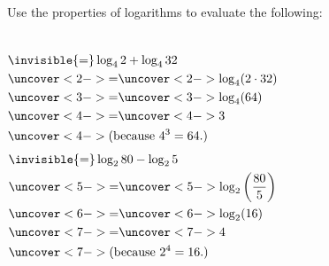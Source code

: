 \begin{frame}
\begin{example}%
Use the properties of logarithms to evaluate the following:
\begin{columns}[t]
\begin{align*}
& \invisible{=} \log_4 2 + \log_4 32 \\
&\uncover<2->{=}  \uncover<2->{\log_4 (2\cdot 32 )} \\
&\uncover<3->{=}  \uncover<3->{\log_4 (64)} \\
&\uncover<4->{=}  \uncover<4->{3} \\
& \uncover<4->{\text{(because $4^3 = 64$.)}}
\end{align*}
\begin{align*}
& \invisible{=} \log_2 80 - \log_2 5 \\
&\uncover<5->{=}  \uncover<5->{\log_2 \left( \frac{80}{5}\right) } \\
&\uncover<6->{=}  \uncover<6->{\log_2 (16)} \\
&\uncover<7->{=}  \uncover<7->{4} \\
& \uncover<7->{\text{(because $2^4 = 16$.)}}
\end{align*}
\end{columns}
\end{example}
\end{frame}
